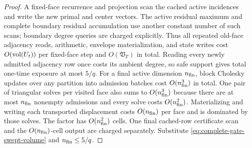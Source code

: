 \begin{proof}
A fixed-face recurrence and projection scan the cached active incidences and
write the new primal and center vectors.  The active residual maximum and
complete boundary residual accumulation use another constant number of such
scans; boundary degree queries are charged explicitly.  Thus all repeated
old-face adjacency reads, arithmetic, envelope materialization, and state
writes cost $O(\operatorname{vol}(U_t))$ per fixed-face step and
$O(\mathfrak V_T)$ in total.  Reading every newly admitted adjacency row once
costs its ambient degree, so safe support gives total one-time exposure at
most $5/q$.  For a final active dimension
$n_{\rm fin}$, block Cholesky updates over any partition into admission
batches cost $O(n_{\rm fin}^3)$ in total.  One pair of triangular solves per
visited face also sums to $O(n_{\rm fin}^3)$ because there are at most
$n_{\rm fin}$ nonempty admissions and every solve costs
$O(n_{\rm fin}^2)$.  Materializing and writing each transported displacement
costs $O(n_{\rm fin})$ per face and is dominated by those solves.  The factor
has $O(n_{\rm fin}^2)$ cells.  One final cached-row certificate scan and the
$O(n_{\rm fin})$-cell output are charged separately.  Substitute
\cref{eq:complete-gate-swept-volume} and
$n_{\rm fin}\leq5/q$.
\end{proof}
